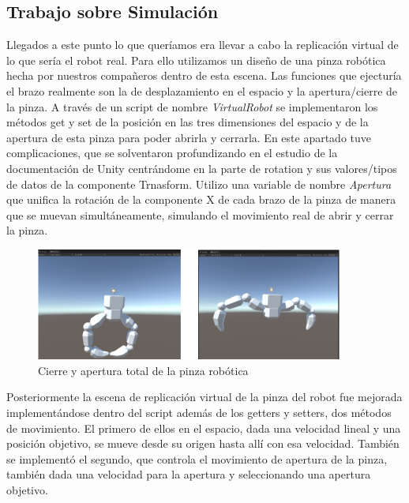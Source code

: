 \subsection{Trabajo sobre Simulación}
Llegados a este punto lo que queríamos era llevar a cabo la replicación virtual de lo que sería el robot real. Para ello utilizamos un diseño de una pinza robótica hecha por nuestros compañeros dentro de esta escena. Las funciones que ejecturía el brazo realmente son la de desplazamiento en el espacio y la apertura/cierre de la pinza. A través de un script de nombre \textit{VirtualRobot} se implementaron los métodos get y set de la posición en las tres dimensiones del espacio y de la apertura de esta pinza para poder abrirla y cerrarla. En este apartado tuve complicaciones, que se solventaron profundizando en el estudio de la documentación de Unity centrándome en la parte de rotation y sus valores/tipos de datos de la componente Trnasform. Utilizo una variable de nombre \textit{Apertura} que unifica la rotación de la componente X de cada brazo de la pinza de manera que se muevan simultáneamente, simulando el movimiento real de abrir y cerrar la pinza. 
\begin{figure}[h]
\centering
\label{Cierre y apertura total de la pinza robótica}
\includegraphics[width=0.9\textwidth]{img/pinza open close.PNG}
\caption{Cierre y apertura total de la pinza robótica}
\end{figure}
 Posteriormente la escena de replicación virtual de la pinza del robot fue mejorada implementándose dentro del script además de los getters y setters, dos métodos de movimiento. El primero de ellos en el espacio, dada una velocidad lineal y una posición objetivo, se mueve desde su origen hasta allí con esa velocidad. También se implementó el segundo, que controla el movimiento de apertura de la pinza, también dada una velocidad para la apertura y seleccionando una apertura objetivo. 
 
